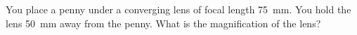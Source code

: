 \documentclass[10pt]{exam}
\begin{document}
\begin{questions}


\question
  You place a penny under a converging lens of focal length 75~mm.  You hold the lens 50~mm away from the penny.  What is the magnification of the lens? 


  \vs[3]
  

\end{questions}
\end{document}

